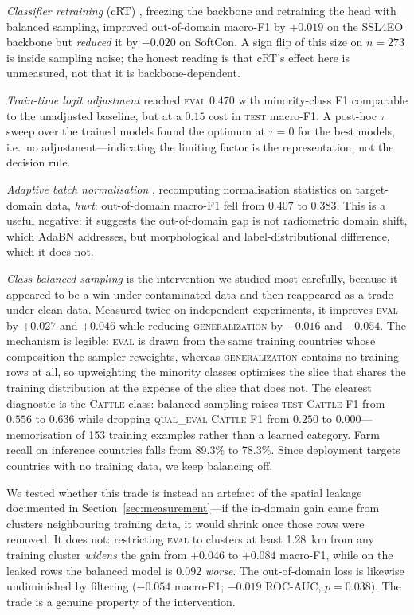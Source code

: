 \documentclass[11pt,a4paper]{article}
\begin{document}
\emph{Classifier retraining} (cRT) \citep{kang2020decoupling}, freezing the
backbone and retraining the head with balanced sampling, improved out-of-domain
macro-F1 by $+0.019$ on the SSL4EO backbone but \emph{reduced} it by $-0.020$ on
SoftCon. A sign flip of this size on $n=273$ is inside sampling noise; the
honest reading is that cRT's effect here is unmeasured, not that it is
backbone-dependent.

\emph{Train-time logit adjustment} \citep{menon2021logit} reached
\textsc{eval} $0.470$ with minority-class F1 comparable to the unadjusted
baseline, but at a $0.15$ cost in \textsc{test} macro-F1. A post-hoc
$\tau$ sweep over the trained models found the optimum at $\tau = 0$ for the
best models, i.e.\ no adjustment---indicating the limiting factor is the
representation, not the decision rule.

\emph{Adaptive batch normalisation} \citep{li2018adabn}, recomputing
normalisation statistics on target-domain data, \emph{hurt}: out-of-domain
macro-F1 fell from $0.407$ to $0.383$. This is a useful negative: it suggests
the out-of-domain gap is not radiometric domain shift, which AdaBN addresses,
but morphological and label-distributional difference, which it does not.

\emph{Class-balanced sampling} is the intervention we studied most carefully,
because it appeared to be a win under contaminated data and then reappeared as a
trade under clean data. Measured twice on independent experiments, it improves
\textsc{eval} by $+0.027$ and $+0.046$ while reducing \textsc{generalization} by
$-0.016$ and $-0.054$. The mechanism is legible: \textsc{eval} is drawn from the
same training countries whose composition the sampler reweights, whereas
\textsc{generalization} contains no training rows at all, so upweighting the
minority classes optimises the slice that shares the training distribution at
the expense of the slice that does not. The clearest diagnostic is the
\textsc{Cattle} class: balanced sampling raises \textsc{test} \textsc{Cattle} F1
from $0.556$ to $0.636$ while dropping \textsc{qual\_eval} \textsc{Cattle} F1
from $0.250$ to $0.000$---memorisation of 153 training examples rather than a
learned category. Farm recall on inference countries falls from 89.3\% to 78.3\%.
Since deployment targets countries with no training data, we keep balancing off.

We tested whether this trade is instead an artefact of the spatial leakage
documented in Section~\ref{sec:measurement}---if the in-domain gain came from
clusters neighbouring training data, it would shrink once those rows were
removed. It does not: restricting \textsc{eval} to clusters at least
\SI{1.28}{\kilo\metre} from any training cluster \emph{widens} the gain from
$+0.046$ to $+0.084$ macro-F1, while on the leaked rows the balanced model is
$0.092$ \emph{worse}. The out-of-domain loss is likewise undiminished by
filtering ($-0.054$ macro-F1; $-0.019$ ROC-AUC, $p = 0.038$). The trade is a
genuine property of the intervention.
\end{document}
